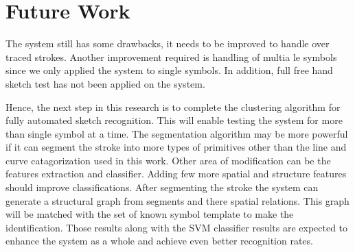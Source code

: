 
\newpage

\section{Future Work}
\label{sec:FutureWork}


The system still has some drawbacks, it needs to be improved to handle over traced strokes. Another improvement required is handling of multia le symbols since we only applied the system to single symbols. In addition, full free hand sketch test has not been applied on the system. %

Hence, the next step in this research is to complete the clustering algorithm for fully automated sketch recognition. This will enable testing the system for more than single symbol at a time. The segmentation algorithm may be more powerful if it can segment the stroke into more types of primitives other than the line and curve catagorization used in this work. Other area of modification can be the features extraction and classifier. Adding few more spatial and structure features should improve classifications. After segmenting the stroke the system can generate a structural graph from segments and there spatial relations. This graph will be matched with the set of known symbol template to make the identification. Those results along with the SVM classifier results are expected to enhance the system as a whole and achieve even better recognition rates.  %




\appendix
